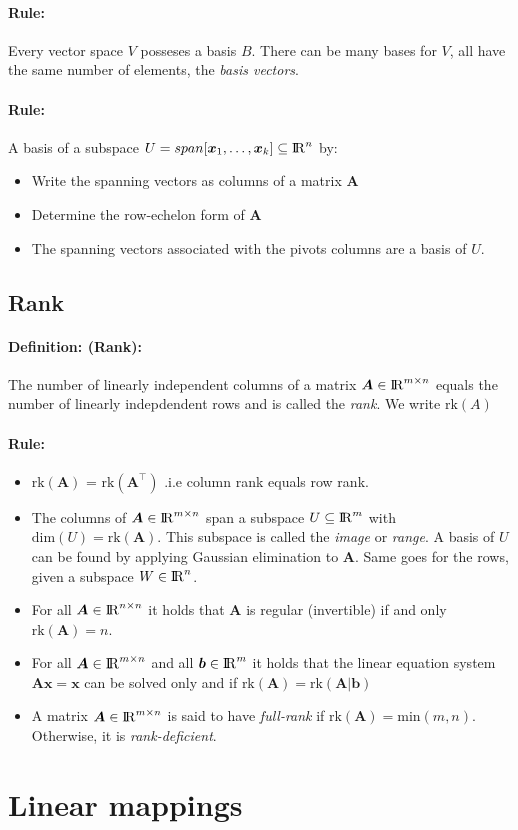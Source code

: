 \documentclass[12pt]{article}
\newcommand{\R}{{\rm I\!R}}
\newcommand{\A}{{\bm{A}}}
\newcommand{\vecs}[2]{{\bm{#1}_1, \dots, \bm{#1}_#2}}
\newcommand{\xdefinition}[2]{\paragraph{\colorbox{#1!30}{\textbf{Definition:}} (#2):}}
\newcommand{\xrule}[1]{\paragraph{\colorbox{#1!30}{\textbf{Rule:}}}}
\begin{document}
\xrule{red} Every vector space $V$ posseses a basis $B$. There can be many bases for $V$, all have the same number of elements, the \textit{basis vectors}.

\xrule{red} A basis of a subspace $U = span[\vecs{x}{k}] \subseteq \R^n$ by:
%
\begin{itemize}
	\item Write the spanning vectors as columns of a matrix $\A$
	\item Determine the row-echelon form of $\A$
	\item The spanning vectors associated with the pivots columns are a basis of $U$. 
\end{itemize}

\subsection{Rank}

\xdefinition{red}{Rank} The number of linearly independent columns of a matrix $\A \in \R^{m \times n}$ equals the number of linearly indepdendent rows and is called the \textit{rank}. We write $\text{rk}(A)$

\xrule{red}
%
\begin{itemize}
	\item $\text{rk}(\A)$ = $\text{rk}(\A^\top)$ .i.e column rank equals row rank.
	\item The columns of $\A \in \R^{m \times n}$ span a subspace $U \subseteq \R^m$ with $\text{dim}(U) = \text{rk}(\A)$. This subspace is called the \textit{image} or \textit{range}. A basis of $U$ can be found by applying Gaussian elimination to $\A$. Same goes for the rows, given a subspace $W \in \R^n$.	
	\item For all $\A \in \R^{n \times n}$ it holds that $\A$ is regular (invertible) if and only $\text{rk}(\A) = n$.
	\item For all $\A \in \R^{m \times n}$ and all $\bm{b} \in \R^m$ it holds that the linear equation system $\A \bm{x} = \bm{x}$ can be solved only and if $\text{rk}(\A) = \text{rk}(\A | \bm{b})$
	\item A matrix $\A \in \R^{m \times n}$ is said to have \textit{full-rank} if $\text{rk}(\A) = \text{min}(m, n)$. Otherwise, it is \textit{rank-deficient}.
\end{itemize}

\section{Linear mappings}
\end{document}

